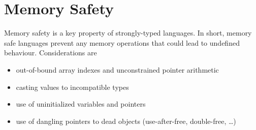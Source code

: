 \section{Memory Safety}
Memory safety is a key property of strongly-typed languages. In short,
memory safe languages prevent any memory operations that could lead to
undefined behaviour. Considerations are
\begin{itemize}
  \item out-of-bound array indexes and unconstrained pointer arithmetic
  \item casting values to incompatible types
  \item use of uninitialized variables and pointers
  \item use of dangling pointers to dead objects (use-after-free, double-free, …)
\end{itemize}